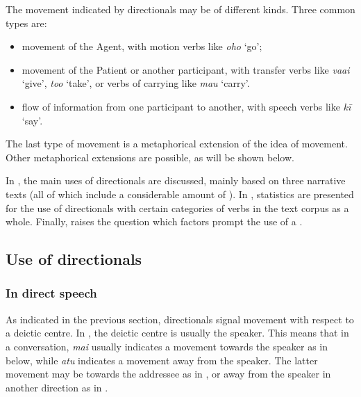 The movement indicated by directionals may be of different kinds. Three common types are:

\begin{itemize}
\item 
movement of the Agent, with motion verbs like \textit{oho} ‘go’;

\item 
movement of the Patient or another participant, with transfer verbs like \textit{va{\ꞌ}ai} ‘give’, \textit{to{\ꞌ}o} ‘take’, or verbs of carrying like \textit{ma{\ꞌ}u} ‘carry’.

\item 
flow of information from one participant to another, with speech verbs like \textit{kī} ‘say’.

\end{itemize}

The last type of movement is a metaphorical extension of the idea of movement. Other metaphorical extensions are possible, as will be shown below.

In , the main uses of directionals are discussed, mainly based on three narrative texts (all of which include a considerable amount of ). In , statistics are presented for the use of directionals with certain categories of verbs in the text corpus as a whole. Finally,  raises the question which factors prompt the use of a .

\subsection{Use of directionals}\label{sec:7.5.1}
\subsubsection[In \isi{direct speech}]{In direct speech}\label{sec:7.5.1.1}

As indicated in the previous section, directionals signal movement with respect to a deictic centre. In , the deictic centre is usually the speaker. This means that in a conversation, \textit{mai} usually indicates a movement towards the speaker as in  below, while \textit{atu} indicates a movement away from the speaker. The latter movement may be towards the addressee as in , or away from the speaker in another direction as in .


